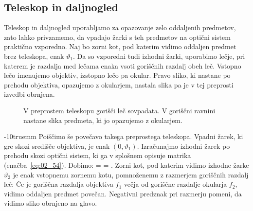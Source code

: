 \subsection*{Teleskop in daljnogled}
Teleskop in daljnogled uporabljamo za opazovanje zelo oddaljenih predmetov, 
zato lahko privzamemo, da vpadajo žarki s teh predmetov na optični sistem praktično vzporedno. 
Naj bo zorni kot, pod katerim vidimo oddaljen predmet brez teleskopa, enak $\vartheta_1$.
Da so vzporedni tudi izhodni žarki, uporabimo lečje, pri katerem je razdalja med 
lečama enaka vsoti goriščnih razdalj obeh leč. Vstopno lečo imenujemo objektiv, 
izstopno lečo pa okular. Pravo sliko, ki nastane po prehodu objektiva,
opazujemo z okularjem, nastala slika pa je v tej preprosti izvedbi obrnjena. 
\begin{figure}[ht]
\centering
\def\svgwidth{100truemm} 

\caption{V preprostem teleskopu gorišči leč sovpadata. V goriščni ravnini nastane 
slika predmeta, ki jo opazujemo z okularjem.}
\label{fig:02_teleskop}
\end{figure}
\vglue-10truemm
Poiščimo še povečavo takega preprostega teleskopa. Vpadni žarek, ki gre skozi središče
objektiva, je enak $(0,\vartheta_1)$. Izračunajmo izhodni žarek po prehodu skozi 
optični sistem, ki ga v splošnem opisuje matrika (enačba~\ref{eq:02_54}). Dobimo:
\beq
{} = 
\cdot
{}  = 
\!\!.
\label{eq:02_66}
\eeq
Zorni kot, pod katerim vidimo izhodne žarke $\vartheta_2$ je enak vstopnemu zornemu kotu, 
pomnoženemu z razmerjem goriščnih razdalj leč:
Če je goriščna razdalja objektiva $f_1$ večja
od goriščne razdalje okularja $f_2$, vidimo oddaljen predmet povečan.
Negativni predznak pri razmerju pomeni, da vidimo sliko obrnjeno na glavo. 

